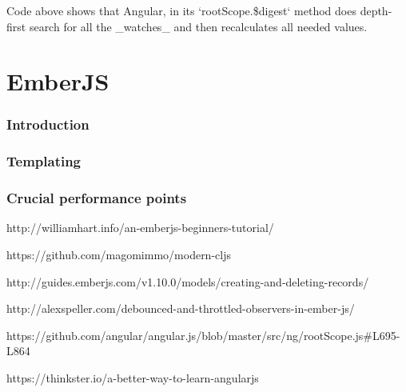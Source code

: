 \documentclass[inzynier,druk,ramka]{build/dyplom}
\begin{document}
Code above shows that Angular, in its `rootScope.\$digest` method does depth-first search for all the \_watches\_ and then recalculates all needed values.

\chapter{EmberJS}

\subsection{Introduction}

\subsection{Templating}

\subsection{Crucial performance points}

\cite{ember2014}

\nocite{*}


\begin{thebibliography}{9}

  http://williamhart.info/an-emberjs-beginners-tutorial/

https://github.com/magomimmo/modern-cljs

http://guides.emberjs.com/v1.10.0/models/creating-and-deleting-records/

http://alexspeller.com/debounced-and-throttled-observers-in-ember-js/

 https://github.com/angular/angular.js/blob/master/src/ng/rootScope.js\#L695-L864

 https://thinkster.io/a-better-way-to-learn-angularjs

\end{thebibliography}
\end{document}
